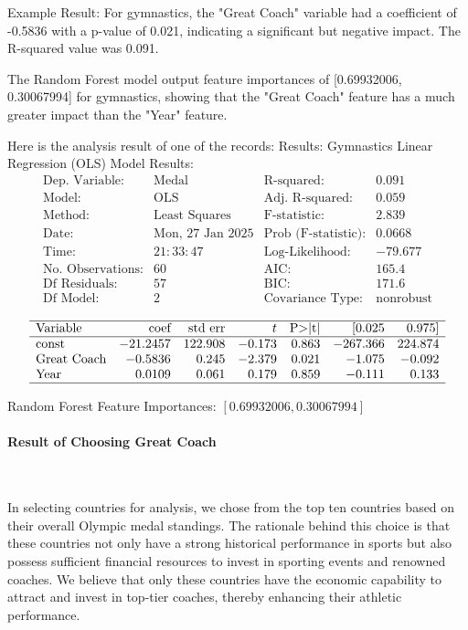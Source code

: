 \documentclass[12pt]{article}
\begin{document}
Example Result:
For gymnastics, the "Great Coach" variable had a coefficient of -0.5836 with a p-value of 0.021, indicating a significant but negative impact. The R-squared value was 0.091.

The Random Forest model output feature importances of [0.69932006, 0.30067994] for gymnastics, showing that the "Great Coach" feature has a much greater impact than the "Year" feature.

Here is the analysis result of one of the records:
Results: Gymnastics
Linear Regression (OLS) Model Results:
$$
\begin{array}{lrrrrrr}
\text{Dep. Variable:} & \text{Medal} & \text{R-squared:} & 0.091 \\
\text{Model:} & \text{OLS} & \text{Adj. R-squared:} & 0.059 \\
\text{Method:} & \text{Least Squares} & \text{F-statistic:} & 2.839 \\
\text{Date:} & \text{Mon, 27 Jan 2025} & \text{Prob (F-statistic):} & 0.0668 \\
\text{Time:} & 21:33:47 & \text{Log-Likelihood:} & -79.677 \\
\text{No. Observations:} & 60 & \text{AIC:} & 165.4 \\
\text{Df Residuals:} & 57 & \text{BIC:} & 171.6 \\
\text{Df Model:} & 2 & \text{Covariance Type:} & \text{nonrobust} \\
\end{array}
$$
$$
\begin{array}{lrrrrrr}
\hline
\text{Variable} & \text{coef} & \text{std err} & t & \text{P>|t|} & [0.025 & 0.975] \\
\hline
\text{const} & -21.2457 & 122.908 & -0.173 & 0.863 & -267.366 & 224.874 \\
\text{Great Coach} & -0.5836 & 0.245 & -2.379 & 0.021 & -1.075 & -0.092 \\
\text{Year} & 0.0109 & 0.061 & 0.179 & 0.859 & -0.111 & 0.133 \\
\hline
\end{array}
$$

Random Forest Feature Importances: $[0.69932006, 0.30067994]$

\paragraph{Result of Choosing Great Coach} \

In selecting countries for analysis, we chose from the top ten countries based on their overall Olympic medal standings. The rationale behind this choice is that these countries not only have a strong historical performance in sports but also possess sufficient financial resources to invest in sporting events and renowned coaches. We believe that only these countries have the economic capability to attract and invest in top-tier coaches, thereby enhancing their athletic performance.
\end{document}
